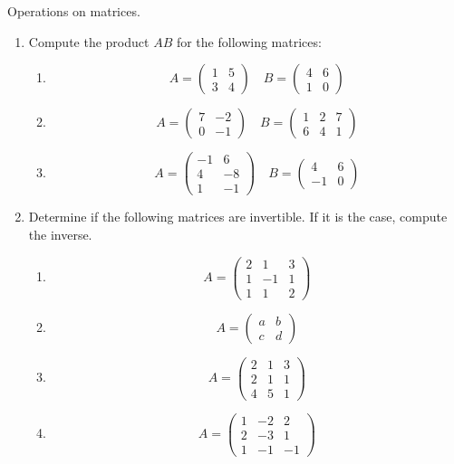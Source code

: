 \begin{Pb} Operations on matrices. 
\begin{enumerate} 
\item Compute the product $AB$ for the following matrices:
\begin{enumerate}
\item \[ A = \begin{pmatrix} 1 & 5 \\ 3 & 4 \end{pmatrix}  \quad B= \begin{pmatrix} 4 & 6 \\ 1 & 0\end{pmatrix}\]
\item \[ A = \begin{pmatrix} 7 & -2 \\ 0 & -1\end{pmatrix} \quad B= \begin{pmatrix} 1 & 2 & 7 \\ 6 & 4 & 1 \end{pmatrix}  \]
\item \[ A = \begin{pmatrix} -1 & 6 \\ 4 & -8 \\ 1 & -1  \end{pmatrix}  \quad B= \begin{pmatrix} 4 & 6 \\ -1 & 0\end{pmatrix}\]
\end{enumerate}
 \item Determine if the following matrices are invertible. If it is the case, compute the inverse.
\begin{enumerate}
\item \[ A =\begin{pmatrix} 2 & 1 & 3 \\ 1 & -1 & 1 \\ 1 & 1 & 2 \end{pmatrix}\]
\item \[ A =\begin{pmatrix} a & b \\ c & d \end{pmatrix}\] 
\item \[ A =\begin{pmatrix} 2 & 1 & 3 \\ 2 & 1 & 1 \\ 4 & 5 & 1\end{pmatrix} \]
\item \[ A =\begin{pmatrix} 1 & -2 & 2 \\ 2 & -3 & 1 \\ 1 & -1 & -1\end{pmatrix} \]
\end{enumerate}
\end{enumerate}
\end{Pb}

